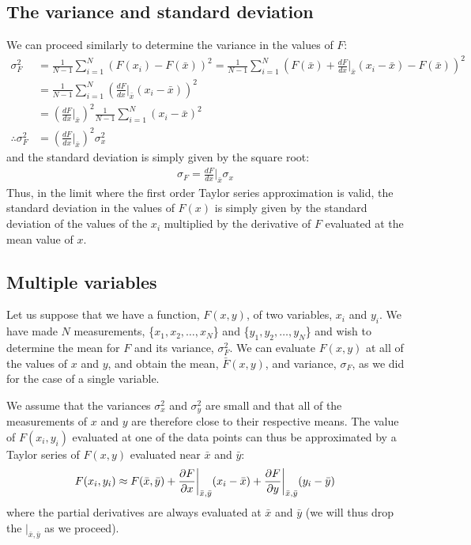 \subsection{The variance and standard deviation}
We can proceed similarly to determine the variance in the values of $F$:
\begin{align}
\sigma_F^2&=\frac{1}{N-1}\sum_{i=1}^{N}\left(F(x_i)-F(\bar x)\right)^2=\frac{1}{N-1}\sum_{i=1}^{N}\left(F(\bar x)+\frac{dF}{dx}\biggr\rvert_{\bar x}(x_i-\bar x)-F(\bar x)\right)^2\nonumber\\
&=\frac{1}{N-1}\sum_{i=1}^{N}\left(\frac{dF}{dx}\biggr\rvert_{\bar x}(x_i-\bar x)\right)^2\nonumber\\
&=\left(\frac{dF}{dx}\biggr\rvert_{\bar x}\right)^2\frac{1}{N-1}\sum_{i=1}^{N}(x_i-\bar x)^2\nonumber\\
\therefore \sigma_F^2 &=\left(\frac{dF}{dx}\biggr\rvert_{\bar x}\right)^2\sigma_x^2
\end{align}
and the standard deviation is simply given by the square root:
\begin{align}
\sigma_F = \frac{dF}{dx}\biggr\rvert_{\bar x}\sigma_x
\end{align}
Thus, in the limit where the first order Taylor series approximation is valid, the standard deviation in the values of $F(x)$ is simply given by the standard deviation of the values of the $x_i$ multiplied by the derivative of $F$  evaluated at the mean value of $x$. 

\subsection{Multiple variables}
Let us suppose that we have a function, $F(x,y)$, of two variables, $x_i$ and $y_i$. We have made $N$ measurements, \{$x_1, x_2, \dots, x_N$\} and \{$y_1, y_2, \dots, y_N$\} and wish to determine the mean for $F$ and its variance, $\sigma^2_F$. We can evaluate $F(x,y)$ at all of the values of $x$ and $y$, and obtain the mean, $\bar F(x,y)$, and variance, $\sigma_F$, as we did for the case of a single variable. 

We assume that the variances $\sigma^2_x$ and $\sigma^2_y$ are small and that all of the measurements of $x$ and $y$ are therefore close to their respective means. The value of $F(x_i,y_i)$ evaluated at one of the data points can thus be approximated by a Taylor series of $F(x,y)$ evaluated near $\bar x$ and $\bar y$:
\begin{align}
F(x_i,y_i)\approx F(\bar x,\bar y)+\frac{\partial F}{\partial x}\biggr\rvert_{\bar x, \bar y}(x_i-\bar x)+\frac{\partial F}{\partial y}\biggr\rvert_{\bar x, \bar y}(y_i-\bar y)
\end{align} 
where the partial derivatives are always evaluated at $\bar x$ and $\bar y$ (we will thus drop the $|_{\bar x, \bar y}$ as we proceed).

